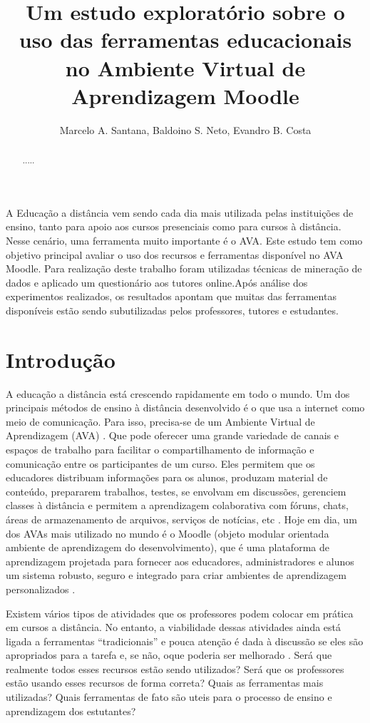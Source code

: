 \documentclass[12pt]{article}
\title{Um estudo exploratório sobre o uso das ferramentas educacionais no Ambiente Virtual de Aprendizagem Moodle}
\author{Marcelo A. Santana\inst{1}, Baldoino S. Neto\inst{1}, Evandro B. Costa\inst{1} }
\begin{document}
 

\maketitle

\begin{abstract}
   .....
\end{abstract}
     
\begin{resumo} 
A Educação a distância vem sendo cada dia mais utilizada pelas instituições de ensino, tanto para apoio aos cursos presenciais como para cursos à distância. Nesse cenário, uma ferramenta muito importante é o AVA. Este estudo tem como objetivo principal avaliar o uso dos recursos e ferramentas disponível no AVA Moodle. Para realização deste trabalho foram utilizadas técnicas de mineração de dados e aplicado um questionário aos tutores online.Após análise dos experimentos realizados, os resultados apontam que muitas das ferramentas disponíveis estão sendo subutilizadas pelos professores, tutores e estudantes.
\end{resumo}


\section{Introdução}

A educação a distância está crescendo rapidamente em todo o mundo. Um dos principais métodos de ensino à distância desenvolvido é o que usa a internet como meio de comunicação. Para isso, precisa-se de um Ambiente Virtual de Aprendizagem (AVA) \cite{Magalhaes:2010:IDU:1999593.1999626}. Que pode oferecer uma grande variedade de canais e espaços de trabalho para facilitar o compartilhamento de informação e comunicação entre os participantes de um curso. Eles permitem que os educadores distribuam informações para os alunos, produzam material de conteúdo, prepararem trabalhos, testes, se envolvam em discussões, gerenciem classes à distância e permitem a aprendizagem colaborativa com fóruns, chats, áreas de armazenamento de arquivos, serviços de notícias, etc \cite{journals/ce/RomeroVG08}. Hoje em dia, um dos AVAs mais utilizado no mundo é o Moodle (objeto modular orientada ambiente de aprendizagem do desenvolvimento), que é uma plataforma de aprendizagem projetada para fornecer aos educadores, administradores e alunos um sistema robusto, seguro e integrado para criar ambientes de aprendizagem personalizados \cite{Moodle:2014}.

Existem vários tipos de atividades que os professores podem colocar em prática em cursos a distância. No entanto, a viabilidade dessas atividades ainda está ligada a ferramentas ``tradicionais'' e pouca atenção é dada à discussão se eles são apropriados para a tarefa e, se não, oque poderia ser melhorado \cite{Oeiras:2006:DDF:1298023.1298032}. Será que realmente todos esses recursos estão sendo utilizados? Será que os professores estão usando esses recursos de forma correta? Quais as ferramentas mais utilizadas? Quais ferramentas de fato são uteis para o processo de ensino e aprendizagem dos estutantes?
\end{document}
